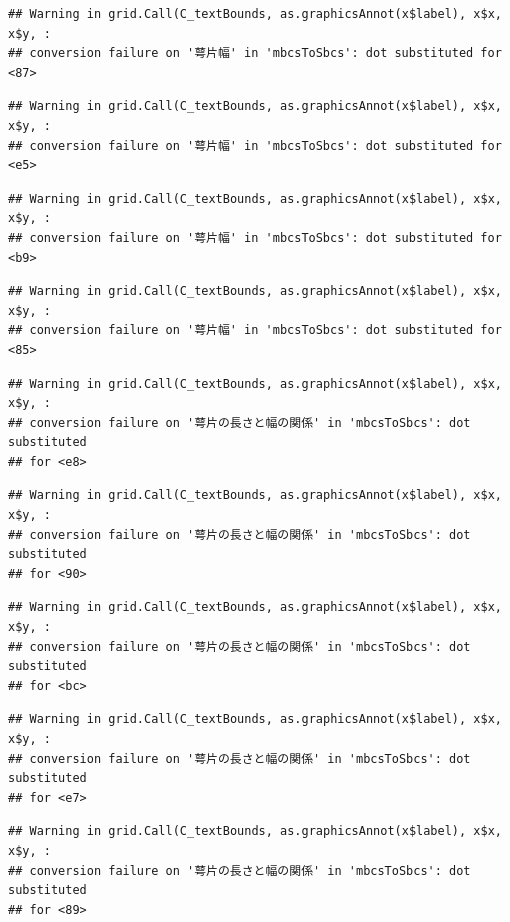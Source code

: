 \documentclass[
]{book}
\begin{document}
\begin{verbatim}
## Warning in grid.Call(C_textBounds, as.graphicsAnnot(x$label), x$x, x$y, :
## conversion failure on '萼片幅' in 'mbcsToSbcs': dot substituted for <87>
\end{verbatim}

\begin{verbatim}
## Warning in grid.Call(C_textBounds, as.graphicsAnnot(x$label), x$x, x$y, :
## conversion failure on '萼片幅' in 'mbcsToSbcs': dot substituted for <e5>
\end{verbatim}

\begin{verbatim}
## Warning in grid.Call(C_textBounds, as.graphicsAnnot(x$label), x$x, x$y, :
## conversion failure on '萼片幅' in 'mbcsToSbcs': dot substituted for <b9>
\end{verbatim}

\begin{verbatim}
## Warning in grid.Call(C_textBounds, as.graphicsAnnot(x$label), x$x, x$y, :
## conversion failure on '萼片幅' in 'mbcsToSbcs': dot substituted for <85>
\end{verbatim}

\begin{verbatim}
## Warning in grid.Call(C_textBounds, as.graphicsAnnot(x$label), x$x, x$y, :
## conversion failure on '萼片の長さと幅の関係' in 'mbcsToSbcs': dot substituted
## for <e8>
\end{verbatim}

\begin{verbatim}
## Warning in grid.Call(C_textBounds, as.graphicsAnnot(x$label), x$x, x$y, :
## conversion failure on '萼片の長さと幅の関係' in 'mbcsToSbcs': dot substituted
## for <90>
\end{verbatim}

\begin{verbatim}
## Warning in grid.Call(C_textBounds, as.graphicsAnnot(x$label), x$x, x$y, :
## conversion failure on '萼片の長さと幅の関係' in 'mbcsToSbcs': dot substituted
## for <bc>
\end{verbatim}

\begin{verbatim}
## Warning in grid.Call(C_textBounds, as.graphicsAnnot(x$label), x$x, x$y, :
## conversion failure on '萼片の長さと幅の関係' in 'mbcsToSbcs': dot substituted
## for <e7>
\end{verbatim}

\begin{verbatim}
## Warning in grid.Call(C_textBounds, as.graphicsAnnot(x$label), x$x, x$y, :
## conversion failure on '萼片の長さと幅の関係' in 'mbcsToSbcs': dot substituted
## for <89>
\end{verbatim}
\end{document}
